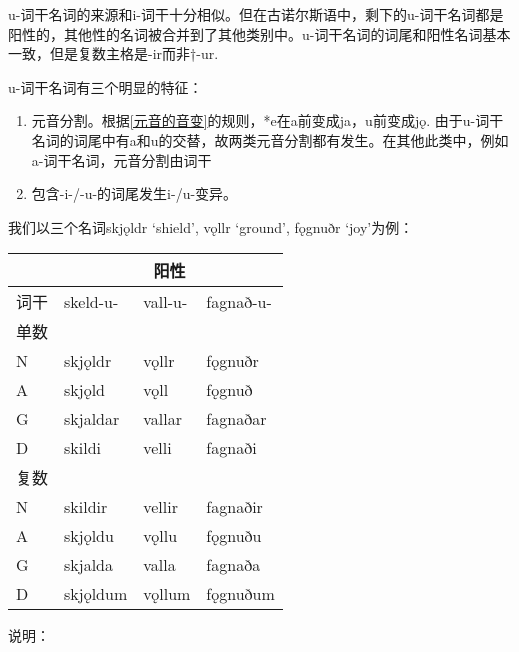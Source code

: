 u-词干名词的来源和i-词干十分相似。但在古诺尔斯语中，剩下的u-词干名词都是阳性的，其他性的名词被合并到了其他类别中。u-词干名词的词尾和阳性名词基本一致，但是复数主格是-ir而非†-ur.

u-词干名词有三个明显的特征：

\begin{enumerate}
  \def\labelenumi{\arabic{enumi})}
  \item
        元音分割。根据\ref{元音的音变}的规则，*e在a前变成ja，u前变成jǫ.
        由于u-词干名词的词尾中有a和u的交替，故两类元音分割都有发生。在其他此类中，例如a-词干名词，元音分割由词干
  \item
        包含-i-/-u-的词尾发生i-/u-变异。
\end{enumerate}

我们以三个名词skjǫldr `shield', vǫllr `ground', fǫgnuðr `joy'为例：

\begin{longtable}{llll}
  \toprule
     & \multicolumn{3}{c}{阳性}                       \\
  \midrule
  \endhead
  \bottomrule
  \endfoot
  词干 & skeld-u-               & vall-u- & fagnað-u- \\
  单数 &                        &         &           \\
  N  & skjǫldr                & vǫllr   & fǫgnuðr   \\
  A  & skjǫld                 & vǫll    & fǫgnuð    \\
  G  & skjaldar               & vallar  & fagnaðar  \\
  D  & skildi                 & velli   & fagnaði   \\
  复数 &                        &         &           \\
  N  & skildir                & vellir  & fagnaðir  \\
  A  & skjǫldu                & vǫllu   & fǫgnuðu   \\
  G  & skjalda                & valla   & fagnaða   \\
  D  & skjǫldum               & vǫllum  & fǫgnuðum  \\
\end{longtable}

说明：

